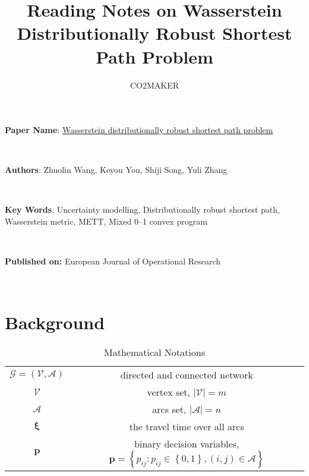 \documentclass{article}
\title{Reading Notes on Wasserstein Distributionally Robust Shortest Path Problem}
\author{CO2MAKER}
\begin{document}
\maketitle 
\allowdisplaybreaks[4]

\noindent \textbf{Paper Name}:  \href{https://www.sciencedirect.com/science/article/abs/pii/S037722172030028X}{Wasserstein distributionally robust shortest path problem}

\

\noindent \textbf{Authors}: Zhuolin Wang, Keyou You, Shiji Song, Yuli Zhang

\

\noindent \textbf{Key Words}: Uncertainty modelling, Distributionally robust shortest path, Wasserstein metric, METT, Mixed 0–1 convex program

\

\noindent \textbf{Published on:} European Journal of Operational Research

\

\tableofcontents

\newpage
\section{Background} 

\begin{table}[htbp]
	\caption{Mathematical Notations}
	\centering
	\begin{tabular}{cc}
		\toprule
		$\mathcal{G} = (\mathcal{V}, \mathcal{A})$ & directed and connected network \\
		$\mathcal{V}$ & vertex set, $|\mathcal{V}| = m$ \\
		$\mathcal{A}$ & arcs set, $|\mathcal{A}| = n$ \\
		$\bm{\xi}$      &  the travel time over all arcs \\
		$\bm{p}$        & binary decision variables, $\bm{p} = \left\{ p_{ij} : p_{ij} \in \left\{0, 1\right\}, (i, j) \in \mathcal{A} \right\}$ \\
		\bottomrule
	\end{tabular}
\end{table}
\end{document}
